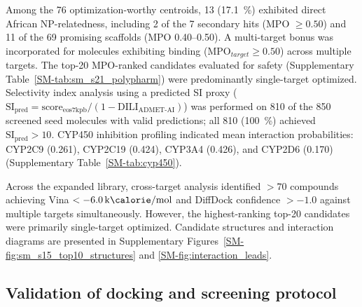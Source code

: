 \documentclass[journal=jcisd8,manuscript=article]{achemso}
\begin{document}
Among the \num{76} optimization-worthy centroids, \num{13} (\qty{17.1}{\percent}) exhibited direct African NP-relatedness, including \num{2} of the \num{7} secondary hits (MPO $\geq \num{0.50}$) and \num{11} of the \num{69} promising scaffolds (MPO \numrange{0.40}{0.50}). A multi-target bonus was incorporated for molecules exhibiting binding ($\text{MPO}_{target} \geq \num{0.50}$) across multiple targets. The top-20 MPO-ranked candidates evaluated for safety (Supplementary Table~\ref{SM-tab:sm_s21_polypharm}) were predominantly single-target optimized. Selectivity index analysis using a predicted SI proxy ($\text{SI}_{\text{pred}} = \text{score}_{\text{eos7kpb}} / (1 - \text{DILI}_{\text{ADMET-AI}})$) was performed on \num{810} of the \num{850} screened seed molecules with valid predictions; all \num{810} (\qty{100}{\percent}) achieved $\text{SI}_{\text{pred}} > \num{10}$. CYP450 inhibition profiling indicated mean interaction probabilities: CYP2C9 (\num{0.261}), CYP2C19 (\num{0.424}), CYP3A4 (\num{0.426}), and CYP2D6 (\num{0.170}) (Supplementary Table~\ref{SM-tab:cyp450}).

Across the expanded library, cross-target analysis identified $ > \num{70}$ compounds achieving Vina $< \qty{-6.0}{\kilo\calorie\per\mole}$ and DiffDock confidence $> \num{-1.0}$ against multiple targets simultaneously. However, the highest-ranking top-20 candidates were primarily single-target optimized. Candidate structures and interaction diagrams are presented in Supplementary Figures~\ref{SM-fig:sm_s15_top10_structures} and \ref{SM-fig:interaction_leads}.

\subsection{Validation of docking and screening protocol}
\end{document}
